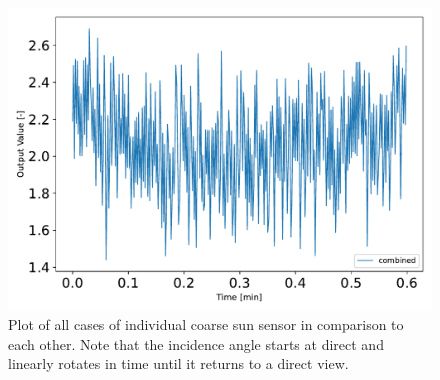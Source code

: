 \begin{figure}[htbp]\centerline{\includegraphics[height=0.7\textwidth, keepaspectratio]{AutoTeX/combinedPlot}}\caption{Plot of all cases of individual coarse sun sensor in comparison to                                              each other. Note that the incidence angle starts at direct and linearly                                               rotates in time until it returns to a direct view.}\label{fig:combinedPlot}\end{figure}
